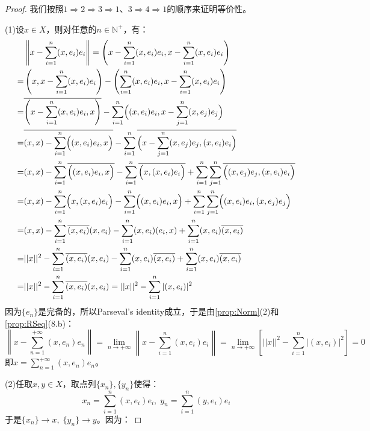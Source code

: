 \begin{proof}
	我们按照$1\Rightarrow2\Rightarrow3\Rightarrow1$、$3\Rightarrow4\Rightarrow1$的顺序来证明等价性。\par
	(1)设$x\in X$，则对任意的$n\in\mathbb{N}^+$，有：
	\begin{align*}
		&\left\|x-\sum_{i=1}^{n}(x,e_i)e_i\right\|=\left(x-\sum_{i=1}^{n}(x,e_i)e_i,x-\sum_{i=1}^{n}(x,e_i)e_i\right) \\
		=&\left(x,x-\sum_{i=1}^{n}(x,e_i)e_i\right)-\left(\sum_{i=1}^{n}(x,e_i)e_i,x-\sum_{i=1}^{n}(x,e_i)e_i\right) \\
		=&\overline{\left(x-\sum_{i=1}^{n}(x,e_i)e_i,x\right)}-\sum_{i=1}^{n}\Bigl((x,e_i)e_i,x-\sum_{j=1}^{n}(x,e_j)e_j\Bigr) \\
		=&\overline{(x,x)-\sum_{i=1}^n\Bigl((x,e_i)e_i,x\Bigr)}-\sum_{i=1}^{n}\overline{\Bigl(x-\sum_{j=1}^{n}(x,e_j)e_j,(x,e_i)e_i\Bigr)} \\
		=&(x,x)-\sum_{i=1}^{n}\overline{\Bigl((x,e_i)e_i,x\Bigr)}-\sum_{i=1}^{n}\overline{\Bigl(x,(x,e_i)e_i\Bigr)}+\sum_{i=1}^{n}\sum_{j=1}^{n}\overline{\Bigl((x,e_j)e_j,(x,e_i)e_i\Bigr)} \\
		=&(x,x)-\sum_{i=1}^{n}\Bigl(x,(x,e_i)e_i\Bigr)-\sum_{i=1}^{n}\Bigl((x,e_i)e_i,x\Bigr)+\sum_{i=1}^{n}\sum_{j=1}^{n}\Bigl((x,e_i)e_i,(x,e_j)e_j\Bigr) \\
		=&(x,x)-\sum_{i=1}^{n}\overline{(x,e_i)}(x,e_i)-\sum_{i=1}^{n}(x,e_i)(e_i,x)+\sum_{i=1}^{n}(x,e_i)\overline{(x,e_i)} \\
		=&||x||^2-\sum_{i=1}^{n}\overline{(x,e_i)}(x,e_i)-\sum_{i=1}^{n}(x,e_i)\overline{(x,e_i)}+\sum_{i=1}^{n}(x,e_i)\overline{(x,e_i)} \\
		=&||x||^2-\sum_{i=1}^{n}\overline{(x,e_i)}(x,e_i)=||x||^2-\sum_{i=1}^{n}|(x,e_i)|^2
	\end{align*}
	因为$\{e_n\}$是完备的，所以Parseval's identity成立，于是由\cref{prop:Norm}(2)和\cref{prop:RSeq}(8.b)：
	\begin{equation*}
		\left\|x-\sum_{n=1}^{+\infty}(x,e_n)e_n\right\|=\lim_{n\to+\infty}\left\|x-\sum_{i=1}^{n}(x,e_i)e_i\right\|=\lim_{n\to+\infty}\left[||x||^2-\sum_{i=1}^{n}|(x,e_i)|^2\right]=0
	\end{equation*}
	即$x=\sum\limits_{n=1}^{+\infty}(x,e_n)e_n$。\par
	(2)任取$x,y\in X$，取点列$\{x_n\},\{y_n\}$使得：
	\begin{equation*}
		x_n=\sum_{i=1}^{n}(x,e_i)e_i,\;y_n=\sum_{i=1}^{n}(y,e_i)e_i
	\end{equation*}
	于是$\{x_n\}\to x,\;\{y_n\}\to y$。因为：

\end{proof}
